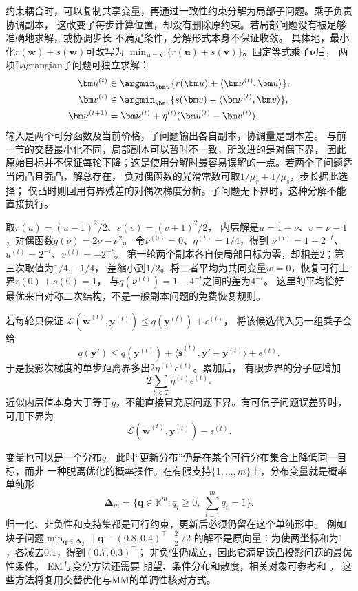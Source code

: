 约束耦合时，可以复制共享变量，再通过一致性约束分解为局部子问题。乘子负责协调副本，
这改变了每步计算位置，却没有删除原约束。若局部问题没有被足够准确地求解，或协调步长
不满足条件，分解形式本身不保证收敛。
具体地，最小化$r(\bm w)+s(\bm w)$可改写为
$\min_{\bm u=\bm v}\{r(\bm u)+s(\bm v)\}$。固定等式乘子$\bm\nu$后，
两项Lagrangian子问题可独立求解：
\begin{align}
 \bm u^{(t)}&\in\argmin_{\bm u}\{r(\bm u)+\langle\bm\nu^{(t)},\bm u\rangle\},\nonumber\\
 \bm v^{(t)}&\in\argmin_{\bm v}\{s(\bm v)-\langle\bm\nu^{(t)},\bm v\rangle\},\nonumber\\
 \bm\nu^{(t+1)}&=\bm\nu^{(t)}+\eta^{(t)}(\bm u^{(t)}-\bm v^{(t)}).
 \label{eq:opt-consensus-dual-decomposition}
\end{align}
输入是两个可分函数及当前价格，子问题输出各自副本，协调量是副本差。
与前一节的交替最小化不同，局部副本可以暂时不一致，所改进的是对偶下界，
因此原始目标并不保证每轮下降；这是使用分解时最容易误解的一点。若两个子问题适当闭凸且强凸，解总存在，
负对偶函数的光滑常数可取$1/\mu_r+1/\mu_s$，步长据此选择；
仅凸时则回用有界残差的对偶次梯度分析。子问题无下界时，这种分解不能直接执行。

取$r(u)=(u-1)^2/2$、$s(v)=(v+1)^2/2$，
内层解是$u=1-\nu$、$v=\nu-1$，对偶函数$q(\nu)=2\nu-\nu^2$。
令$\nu^{(0)}=0$、$\eta^{(t)}=1/4$，得到
$\nu^{(t)}=1-2^{-t}$、$u^{(t)}=2^{-t}$、$v^{(t)}=-2^{-t}$。
第一轮两个副本各自使局部目标为零，却相差$2$；第三次取值为$1/4,-1/4$，
差缩小到$1/2$。将二者平均为共同变量$w=0$，恢复可行上界$r(0)+s(0)=1$，
与$q(\nu^{(t)})=1-4^{-t}$之间的差为$4^{-t}$。
这里的平均恰好最优来自对称二次结构，不是一般副本问题的免费恢复规则。

若每轮只保证
$\mathcal L(\widetilde{\bm w}^{(t)},\bm y^{(t)})\leq q(\bm y^{(t)})+\epsilon^{(t)}$，
将该候选代入另一组乘子会给
\[
 q(\bm y')\leq q(\bm y^{(t)})
 +\langle\widetilde{\bm s}^{(t)},\bm y'-\bm y^{(t)}\rangle+\epsilon^{(t)}.
\]
于是投影次梯度的单步距离界多出$2\eta^{(t)}\epsilon^{(t)}$。累加后，
有限步界的分子应增加
\[
 2\sum_{t<T}\eta^{(t)}\epsilon^{(t)}.
\]
近似内层值本身大于等于$q$，不能直接冒充原问题下界。有可信子问题误差界时，
可用下界为
\[
 \mathcal L(\widetilde{\bm w}^{(t)},\bm y^{(t)})-\epsilon^{(t)}.
\]

变量也可以是一个分布$q$。此时“更新分布”仍是在某个可行分布集合上降低同一目标，而非
一种脱离优化的概率操作。在有限支持$\{1,\ldots,m\}$上，分布变量就是概率单纯形
\[
  \bm{\Delta}_m
  =\{\bm{q}\in\mathbb{R}^m:q_i\geq0,\ \sum_{i=1}^m q_i=1\}.
\]
归一化、非负性和支持集都是可行约束，更新后必须仍留在这个单纯形中。
例如块子问题$\min_{\bm q\in\bm\Delta_2}\|\bm q-(0.8,0.4)^\top\|_2^2/2$
的解不是原向量：为使两坐标和为$1$，各减去$0.1$，得到$(0.7,0.3)^\top$；
非负性仍成立，因此它满足该凸投影问题的最优性条件。
EM与变分方法还需要
期望、条件分布和散度，相关对象可参考和
。
这些方法将复用交替优化与MM的单调性核对方式。

